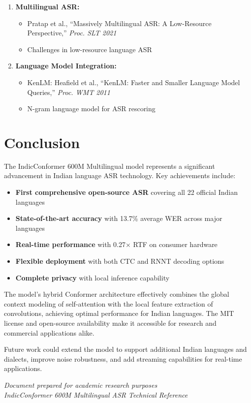 \documentclass[12pt,a4paper]{article}
\begin{document}
\begin{enumerate}[leftmargin=*]
\item \textbf{Multilingual ASR:}
  \begin{itemize}
  \item Pratap et al., ``Massively Multilingual ASR: A Low-Resource Perspective,'' \textit{Proc. SLT 2021}
  \item Challenges in low-resource language ASR
  \end{itemize}

\item \textbf{Language Model Integration:}
  \begin{itemize}
  \item KenLM: Heafield et al., ``KenLM: Faster and Smaller Language Model Queries,'' \textit{Proc. WMT 2011}
  \item N-gram language model for ASR rescoring
  \end{itemize}
\end{enumerate}

\section{Conclusion}

The IndicConformer 600M Multilingual model represents a significant advancement in Indian language ASR technology. Key achievements include:

\begin{itemize}[leftmargin=*]
\item \textbf{First comprehensive open-source ASR} covering all 22 official Indian languages
\item \textbf{State-of-the-art accuracy} with 13.7\% average WER across major languages
\item \textbf{Real-time performance} with 0.27$\times$ RTF on consumer hardware
\item \textbf{Flexible deployment} with both CTC and RNNT decoding options
\item \textbf{Complete privacy} with local inference capability
\end{itemize}

The model's hybrid Conformer architecture effectively combines the global context modeling of self-attention with the local feature extraction of convolutions, achieving optimal performance for Indian languages. The MIT license and open-source availability make it accessible for research and commercial applications alike.

Future work could extend the model to support additional Indian languages and dialects, improve noise robustness, and add streaming capabilities for real-time applications.

\vfill
\begin{center}
\textit{Document prepared for academic research purposes}\\
\textit{IndicConformer 600M Multilingual ASR Technical Reference}
\end{center}
\end{document}
